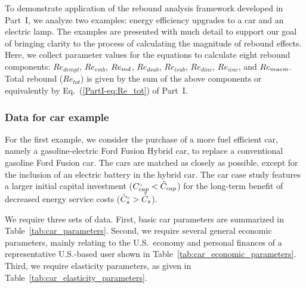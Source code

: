 \documentclass[12pt]{article}\usepackage[]{graphicx}\usepackage[]{xcolor}
\begin{document}
To demonstrate application of the rebound analysis framework
developed in Part~I,
we analyze two examples:
energy efficiency upgrades to a car and an electric lamp.
The examples are presented with much detail 
to support our goal of bringing clarity to the process
of calculating the magnitude of rebound effects.
Here, we collect parameter values
for the equations to calculate
eight rebound components:
$Re_{dempl}$,
$Re_{emb}$,
$Re_{md}$,
$Re_{dsub}$,
$Re_{isub}$,
$Re_{dinc}$,
$Re_{iinc}$, and
$Re_{macr\!o}$.
Total rebound 
($Re_{tot}$)
is given by the sum of the above components
or equivalently by Eq.~(\ref{PartI-eq:Re_tot}) of Part~I.


\subsubsection{Data for car example} 
\label{sec:data_car_example}



For the first example, 
we consider the purchase of a more fuel efficient car, 
namely a gasoline-electric Ford Fusion Hybrid car,
to replace a conventional gasoline Ford Fusion car. 
The cars are matched as closely as possible, 
except for the inclusion of an electric battery 
in the hybrid car.  
The car case study features a larger initial capital investment (${}{C}^{\scriptscriptstyle \circ}_{cap} < \tilde{C}_{cap}$)
for the long-term benefit of decreased energy service costs (${}{\dot{C}}^{\scriptscriptstyle \circ}_s > \tilde{\dot{C}}_s$). 

We require three sets of data. 
First, basic car parameters are summarized 
in Table~\ref{tab:car_parameters}.
Second, we require several general economic parameters, 
mainly relating to the U.S.\ economy and personal finances 
of a representative U.S.-based user
shown in Table~\ref{tab:car_economic_parameters}.
Third, we require elasticity parameters, 
as given in Table~\ref{tab:car_elasticity_parameters}.



\renewcommand{\arraystretch}{0.6}
\end{document}
